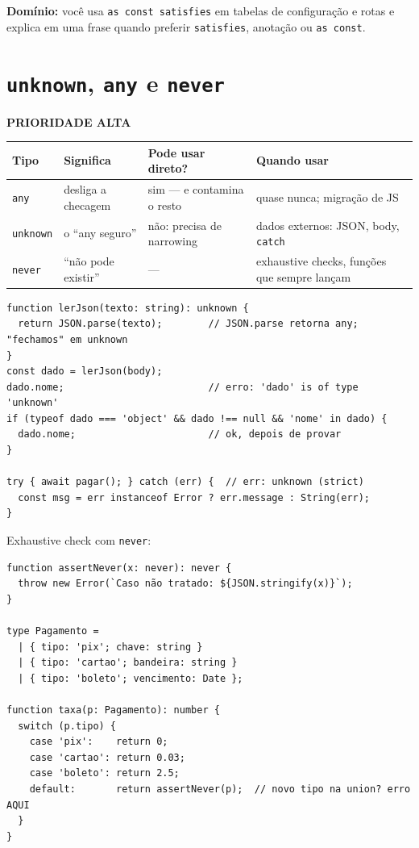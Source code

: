 \documentclass[12pt,a4paper,oneside]{book}
\newcommand{\alta}{\colorbox{red!15}{\sffamily\scriptsize\bfseries PRIORIDADE ALTA}}
\newcommand{\code}[1]{\texttt{#1}}
\newcommand{\dom}[1]{\begin{dominio}\textbf{Domínio:} #1\end{dominio}}
\begin{document}
\dom{você usa \code{as const satisfies} em tabelas de configuração e rotas e explica em uma frase quando preferir \code{satisfies}, anotação ou \code{as const}.}

\section{\texttt{unknown}, \texttt{any} e \texttt{never}}
\label{sec:unknown}
\alta

{\small
\begin{tabularx}{\textwidth}{@{}lXXX@{}}
\toprule
\textbf{Tipo} & \textbf{Significa} & \textbf{Pode usar direto?} & \textbf{Quando usar} \\
\midrule
\code{any} & desliga a checagem & sim --- e contamina o resto & quase nunca; migração de JS \\
\code{unknown} & o ``any seguro'' & não: precisa de narrowing & dados externos: JSON, body, \code{catch} \\
\code{never} & ``não pode existir'' & --- & exhaustive checks, funções que sempre lançam \\
\bottomrule
\end{tabularx}
}

\begin{verbatim}
function lerJson(texto: string): unknown {
  return JSON.parse(texto);        // JSON.parse retorna any; "fechamos" em unknown
}
const dado = lerJson(body);
dado.nome;                         // erro: 'dado' is of type 'unknown'
if (typeof dado === 'object' && dado !== null && 'nome' in dado) {
  dado.nome;                       // ok, depois de provar
}

try { await pagar(); } catch (err) {  // err: unknown (strict)
  const msg = err instanceof Error ? err.message : String(err);
}
\end{verbatim}

Exhaustive check com \code{never}:

\begin{verbatim}
function assertNever(x: never): never {
  throw new Error(`Caso não tratado: ${JSON.stringify(x)}`);
}

type Pagamento =
  | { tipo: 'pix'; chave: string }
  | { tipo: 'cartao'; bandeira: string }
  | { tipo: 'boleto'; vencimento: Date };

function taxa(p: Pagamento): number {
  switch (p.tipo) {
    case 'pix':    return 0;
    case 'cartao': return 0.03;
    case 'boleto': return 2.5;
    default:       return assertNever(p);  // novo tipo na union? erro AQUI
  }
}
\end{verbatim}
\end{document}
